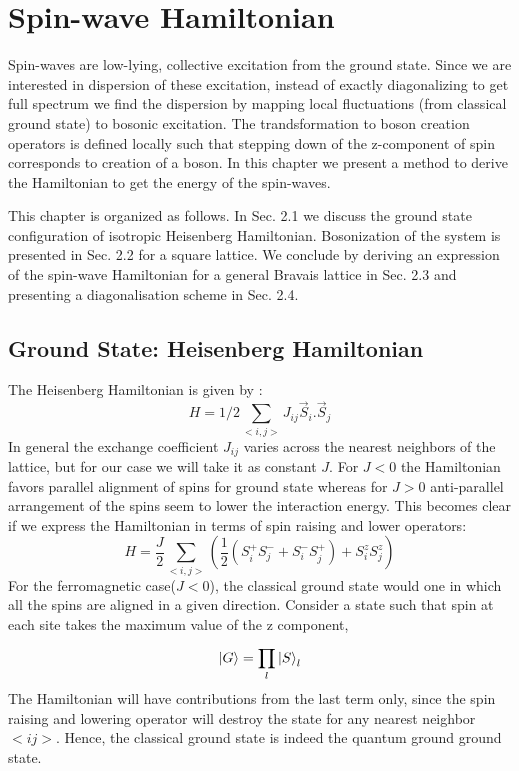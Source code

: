 \chapter{\label{method}Spin-wave Hamiltonian}
Spin-waves are low-lying, collective excitation from the ground state. Since we are interested in dispersion of these excitation, instead of exactly diagonalizing to get full spectrum we find the dispersion by mapping local fluctuations (from classical ground state) to bosonic excitation. The trandsformation to boson creation operators is defined locally such that stepping down of the z-component of spin corresponds to creation of a boson. In this chapter we present a method to derive the Hamiltonian to get the energy of the spin-waves.

This chapter is organized as follows. In Sec. 2.1 we discuss the ground state configuration of isotropic Heisenberg Hamiltonian. Bosonization of the system is presented in Sec. 2.2 for a square lattice. We conclude by deriving an expression of the spin-wave Hamiltonian for a general Bravais lattice in Sec. 2.3 and presenting a diagonalisation scheme in Sec. 2.4.
\section{Ground State: Heisenberg Hamiltonian}

The Heisenberg Hamiltonian is given by :
\begin{equation}
H = 1/2\sum_{<i,j>}{ }J_{ij}\vec{S}_i.\vec{S}_j
\end{equation}
In general the exchange coefficient $ J_{ij} $ varies across the nearest neighbors of the lattice, but for our case we will take it as constant $ J $.  For $ J < 0 $ the Hamiltonian favors parallel alignment of spins for ground state whereas for $ J > 0 $ anti-parallel arrangement of the spins seem to lower the interaction energy. This becomes clear if we express the Hamiltonian in terms of spin raising and lower operators:
\begin{equation}
H = \frac{J}{2}\sum_{<i,j>}^{}(\frac{1}{2}(S^+_iS^-_j + S^-_iS^+_j) + S^z_iS^z_j)
\end{equation}
For the ferromagnetic case($ J < 0 $), the classical ground state would one in which all the spins are aligned in a given direction. Consider a state such that spin at each site takes the maximum value of the z component,
\begin{equation}\label{eq22}
\ket{G} = \prod_{l}^{}\ket{S}_l
\end{equation} 
The Hamiltonian will have contributions from the last term only, since the spin raising and lowering operator will destroy the state for any nearest neighbor $ <ij> $. Hence, the classical ground state is indeed the quantum ground ground state.


